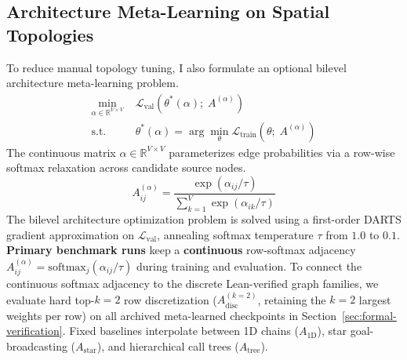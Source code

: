 \documentclass[10pt,twocolumn,letterpaper]{article}
\begin{document}
\subsection{Architecture Meta-Learning on Spatial Topologies}
To reduce manual topology tuning, I also formulate an optional bilevel architecture meta-learning problem.
\begin{equation}
  \begin{aligned}
    \min_{\alpha \in \mathbb{R}^{V \times V}} \; & \mathcal{L}_{\text{val}}\left(\theta^*(\alpha); \; A^{(\alpha)}\right) \\
    \text{s.t.} \; & \theta^*(\alpha) = \arg\min_\theta \mathcal{L}_{\text{train}}(\theta; \; A^{(\alpha)})
  \end{aligned}
\end{equation}
The continuous matrix $\alpha \in \mathbb{R}^{V \times V}$ parameterizes edge probabilities via a row-wise softmax relaxation across candidate source nodes.
\begin{equation}
  A_{ij}^{(\alpha)} = \frac{\exp(\alpha_{ij} / \tau)}{\sum_{k=1}^V \exp(\alpha_{ik} / \tau)}
\end{equation}
The bilevel architecture optimization problem is solved using a first-order DARTS gradient approximation on $\mathcal{L}_{\text{val}}$, annealing softmax temperature $\tau$ from $1.0$ to $0.1$. \textbf{Primary benchmark runs} keep a \textbf{continuous} row-softmax adjacency $A^{(\alpha)}_{ij} = \mathrm{softmax}_j(\alpha_{ij}/\tau)$ during training and evaluation. To connect the continuous softmax adjacency to the discrete Lean-verified graph families, we evaluate hard top-$k=2$ row discretization ($A_{\text{disc}}^{(k=2)}$, retaining the $k=2$ largest weights per row) on all archived meta-learned checkpoints in Section~\ref{sec:formal-verification}. Fixed baselines interpolate between 1D chains ($A_{\text{1D}}$), star goal-broadcasting ($A_{\text{star}}$), and hierarchical call trees ($A_{\text{tree}}$).
\end{document}
